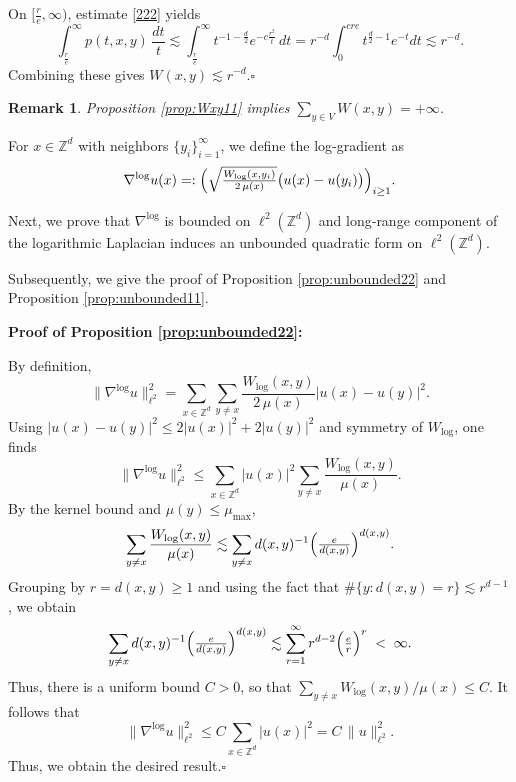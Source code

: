 \documentclass[reqno,12pt]{amsart}
\numberwithin{equation}{section}
\newtheorem{remark}[theorem]{Remark}
\begin{document}
	On \([\frac{r}{e},\infty)\), estimate \eqref{222} yields
	\[
	\int_{\frac{r}{e}}^\infty p(t,x,y)\,\frac{dt}{t}\lesssim \int_{\frac{r}{e}}^\infty t^{-1-\frac d2}e^{-c\frac{r^2}{t}}\,dt=r^{-d}\int_0^{cre}t^{\frac{d}{2}-1}e^{-t}dt\lesssim r^{-d}.
	\]
	Combining these gives \(W(x,y)\lesssim r^{-d}\).\hfill $\square$


\begin{remark}
	Proposition \ref{prop:Wxy11} implies 
	\(\sum_{y\in V}W(x,y)=+\infty\).
\end{remark}



For \(x\in\mathbb{Z}^d\) with neighbors \(\{y_i\}_{i=1}^\infty\), we define the log-gradient as
\[
\nabla^{\log}u(x)
=:\Bigl(
\sqrt{\tfrac{W_{\log}(x,y_i)}{2\,\mu(x)}}\bigl(u(x)-u(y_i)\bigr)
\Bigr)_{i\ge1}.
\]

Next, we prove that $	\nabla^{\log}$ is bounded on \(\ell^2(\mathbb{Z}^d)\) and long‐range component of the logarithmic Laplacian induces an unbounded quadratic form on \(\ell^2(\mathbb{Z}^d)\).




Subsequently, we give the proof of Proposition \ref{prop:unbounded22} and Proposition \ref{prop:unbounded11}. 

	\vspace{1\baselineskip}
	
\noindent \textbf{Proof of Proposition \ref{prop:unbounded22}:}

	By definition,
	\[
	\|\nabla^{\log}u\|_{\ell^2}^2
	=\sum_{x\in\mathbb{Z}^d}\sum_{y\ne x}\frac{W_{\log}(x,y)}{2\,\mu(x)}\bigl|u(x)-u(y)\bigr|^2.
	\]
	Using \(\lvert u(x)-u(y)\rvert^2\le2\lvert u(x)\rvert^2+2\lvert u(y)\rvert^2\) and symmetry of \(W_{\log}\), one finds
	\[
	\|\nabla^{\log}u\|_{\ell^2}^2
	\le\sum_{x\in\mathbb{Z}^d}\lvert u(x)\rvert^2\sum_{y\ne x}\frac{W_{\log}(x,y)}{\mu(x)}.
	\]
	By the kernel bound and \(\mu(y)\le \mu_{\max}\),
	\[
	\sum_{y\ne x}\frac{W_{\log}(x,y)}{\mu(x)}\lesssim\sum_{y\ne x}d(x,y)^{-1}\Bigl(\tfrac{e}{d(x,y)}\Bigr)^{d(x,y)}.
	\]
	Grouping by \(r=d(x,y)\ge1\) and using the fact that \(\#\{y:d(x,y)=r\}\lesssim r^{d-1}\), we obtain
	\[
	\sum_{y\ne x}d(x,y)^{-1}\Bigl(\tfrac{e}{d(x,y)}\Bigr)^{d(x,y)}\lesssim \sum_{r=1}^\infty r^{d-2}\Bigl(\tfrac{e}{r}\Bigr)^r
	\;<\;\infty.
	\]
	Thus, there is a uniform bound \(C>0\), so that
	\(\sum_{y\ne x}W_{\log}(x,y)/\mu(x)\le C\).  It follows that
	\[
	\|\nabla^{\log}u\|_{\ell^2}^2
	\le C\sum_{x\in\mathbb{Z}^d}\lvert u(x)\rvert^2
	=C\,\|u\|_{\ell^2}^2.
	\]
	Thus, we obtain the desired result.\hfill $\square$
\end{document}
